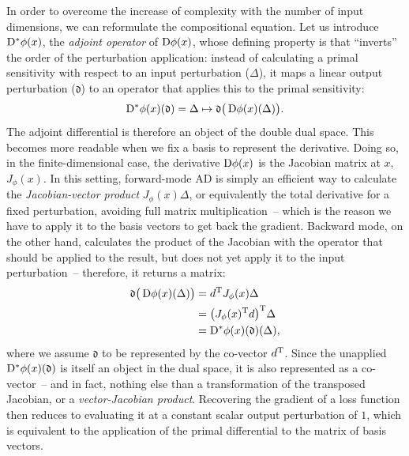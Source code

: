 In order to overcome the increase of complexity with the number of input dimensions, we can
reformulate the compositional equation.  Let us introduce \(\mathop{}\!\mathrm{D}^{*} \phi(x)\), the \emph{adjoint
  operator} of \(\mathop{}\!\mathrm{D} \phi(x)\), whose defining property is that \enquote{inverts} the order of the
perturbation application: instead of calculating a primal sensitivity with respect to an input
perturbation (\(\Delta\)), it maps a linear output perturbation (\(\mathfrak{d}\)) to an operator
that applies this to the primal sensitivity:
\begin{equation}
  \mathop{}\!\mathrm{D}^{*} \phi(x)(\mathfrak{d}) = \Delta \mapsto \mathfrak{d} \big(\mathop{}\!\mathrm{D} \phi(x)(\Delta) \big).
\end{equation}
The adjoint differential is therefore an object of the double dual space.  This becomes more
readable when we fix a basis to represent the derivative.  Doing so, in the finite-dimensional case,
the derivative \(\mathop{}\!\mathrm{D} \phi(x)\) is the Jacobian matrix at \(x\), \(J_{\phi}(x)\).  In this setting,
forward-mode AD is simply an efficient way to calculate the \emph{Jacobian-vector product}
\(J_{\phi}(x) \Delta\), or equivalently the total derivative for a fixed perturbation, avoiding full
matrix multiplication~-- which is the reason we have to apply it to the basis vectors to get back
the gradient.  Backward mode, on the other hand, calculates the product of the Jacobian with the
operator that should be applied to the result, but does not yet apply it to the input
perturbation~-- therefore, it returns a matrix:
\begin{equation}
  \begin{aligned}
    \mathfrak{d} \big( \mathop{}\!\mathrm{D} \phi(x)(\Delta) \big) &= d^{\mathrm{T}} J_{\phi}(x) \Delta \\
    &= \big( J_{\phi}(x)^{\mathrm{T}} d \big)^{\mathrm{T}} \Delta \\
    &= \mathop{}\!\mathrm{D}^{*} \phi(x)(\mathfrak{d})(\Delta),
  \end{aligned}
\end{equation}
where we assume \(\mathfrak{d}\) to be represented by the co-vector \(d^{\mathrm{T}}\).  Since the
unapplied \(\mathop{}\!\mathrm{D}^{*} \phi(x)(\mathfrak{d})\) is itself an object in the dual space, it is also
represented as a co-vector~-- and in fact, nothing else than a transformation of the transposed
Jacobian, or a \emph{vector-Jacobian product}.  Recovering the gradient of a loss function then
reduces to evaluating it at a constant scalar output perturbation of \(1\), which is equivalent to
the application of the primal differential to the matrix of basis vectors.

